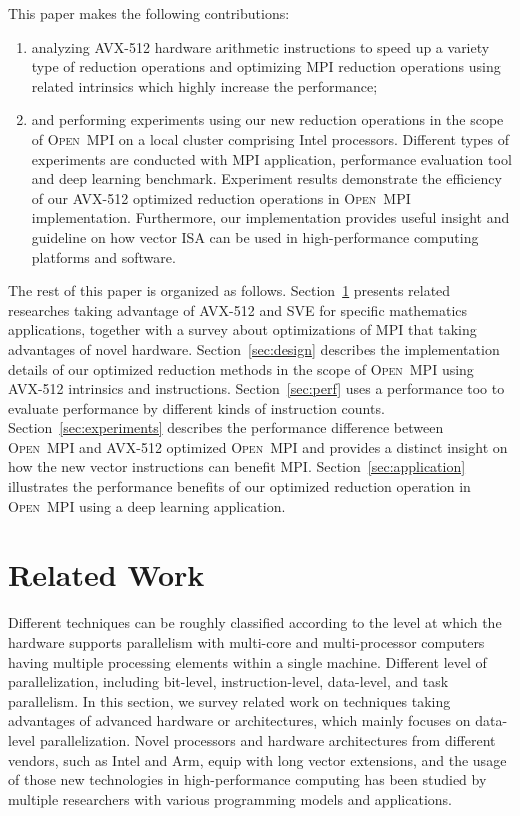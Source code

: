 \documentclass[sigconf]{acmart}
\newcommand{\ompi}[0]{\textsc{Open~MPI}\xspace}
\newcommand{\mpi}[0]{\textsc{MPI}\xspace}
\newcommand{\sve}[0]{\textsc{SVE}\xspace}
\begin{document}
This paper makes the following contributions:
\begin{enumerate}
  \item analyzing AVX-512 hardware arithmetic instructions to speed up a variety
  type of reduction operations and optimizing \mpi reduction operations using
  related intrinsics which highly increase the performance;
  \item and performing experiments using our new reduction operations in the scope
  of \ompi on a local cluster comprising Intel processors. Different types of
  experiments are conducted with \mpi application, performance evaluation tool and
  deep learning benchmark.
  Experiment results demonstrate the efficiency of our AVX-512 optimized reduction
  operations in \ompi implementation.
  Furthermore, our implementation provides useful insight and guideline on how vector
  ISA can be used in high-performance computing platforms and software.
\end{enumerate}

The rest of this paper is organized as follows.
Section~\ref{sec:related} presents related researches taking advantage of AVX-512 and \sve for specific mathematics applications, together with a survey about optimizations of \mpi that taking advantages of novel hardware.
Section~\ref{sec:design} describes the implementation details of our optimized reduction methods in the scope of \ompi using AVX-512 intrinsics and instructions.
Section~\ref{sec:perf} uses a performance too to evaluate performance by different kinds of instruction counts.
Section~\ref{sec:experiments} describes the performance difference between
\ompi and AVX-512 optimized \ompi and provides a distinct insight on how the
new vector instructions can benefit \mpi.
Section~\ref{sec:application} illustrates the performance benefits of our
optimized reduction operation in \ompi using a deep learning application.

\section{Related Work}\label{sec:related}
Different techniques can be roughly classified according to the level at which
the hardware supports parallelism with multi-core and multi-processor computers having
multiple processing elements within a single machine. Different level of parallelization,
including bit-level, instruction-level, data-level, and task parallelism.
%
In this section, we survey related work on techniques taking advantages of
advanced hardware or architectures, which mainly focuses on data-level parallelization.
Novel processors and hardware architectures from different vendors, such as Intel and Arm,
equip with long vector extensions, and the usage of those new technologies in high-performance computing has been
studied by multiple researchers with various programming models and applications.
%
\end{document}
